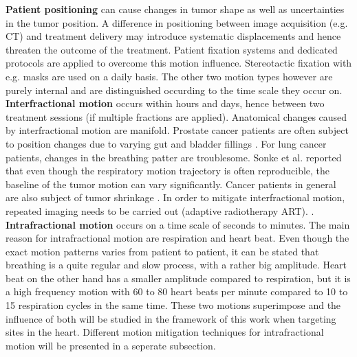 \documentclass[type=dr, dr=rernat, accentcolor=tud7b,colorbacktitle, bigchapter, openright, twoside, 12pt ]{tudthesis}
\begin{document}
\textbf{Patient positioning} can cause changes in tumor shape as well as uncertainties in the tumor position. A difference in positioning 
between image acquisition (e.g. CT) and treatment delivery may introduce systematic displacements and hence threaten the outcome of the 
treatment. Patient fixation systems and dedicated protocols are applied to overcome this motion influence. Stereotactic fixation with e.g. 
masks are used on a daily basis.
The other two motion types however are purely internal and are distinguished occurding to the time scale they 
occur on.\newline
\newline
\textbf{Interfractional motion} occurs within hours and days, hence between two treatment sessions (if multiple fractions 
are applied). Anatomical changes caused by interfractional motion are manifold. Prostate cancer patients are often subject to position 
changes due to varying gut and bladder fillings \cite{Fok04}. For lung cancer patients, changes in the breathing patter are troublesome. 
Sonke et al. \cite{Son08} reported that even though the respiratory motion trajectory is often reproducible, the baseline of the tumor 
motion can vary significantly. Cancer patients in general are also subject of tumor shrinkage \cite{Mor09}. In order to mitigate 
interfractional motion, repeated imaging needs to be carried out (adaptive radiotherapy ART). \cite{Son10} \cite{Mur11}.\newline
\newline
\textbf{Intrafractional motion} occurs on a time scale of seconds to minutes. The main reason for intrafractional motion are respiration 
and heart beat. Even though the exact motion patterns varies from patient to patient, it can be stated that breathing is a quite regular 
and slow process, with a rather big amplitude. Heart beat on the other hand has a smaller amplitude compared to respiration, but it is a 
high frequency motion with 60 to 80 heart beats per minute compared to 10 to 15 respiration cycles in the same time. These two motions 
superimpose and the influence of both will be studied in the framework of this work when targeting sites in the heart. Different motion 
mitigation techniques for intrafractional motion will be presented in a seperate subsection. 
\end{document}
